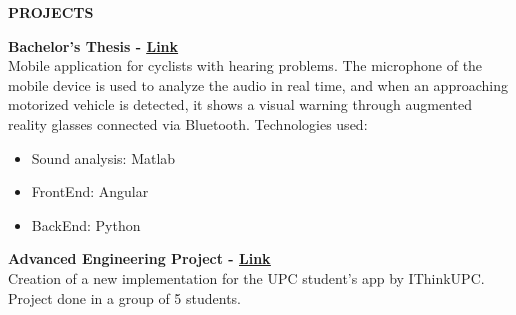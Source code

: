 \documentclass[../main.tex]{subfiles}
\begin{document}
    \textbf{\textcolor{myCV2}{PROJECTS\underline{\hspace{15.8cm}}}}
    \vspace*{0.3cm}
    
    \textbf{Bachelor's Thesis - 
        \hspace*{0.07cm}
        \textcolor{myCV2}{
        \vspace*{0.1cm}\underline{\href{https://www.youtube.com/watch?v=WKyUsdZbQ0Y}{Link}}}}\\
        Mobile application for cyclists with hearing problems. The microphone of the mobile device is used to analyze the audio in real time, and when an approaching motorized vehicle is detected, it shows a visual warning through augmented reality glasses connected via Bluetooth. Technologies used:

        \begin{itemize}
            \vspace*{-0.2cm}
            \item Sound analysis: Matlab
            \vspace*{-0.2cm}
            \item FrontEnd: Angular
            \vspace*{-0.2cm}
            \item BackEnd: Python
        \end {itemize}
        
        \textbf{Advanced Engineering Project - 
         \hspace*{0.07cm}
         \textcolor{myCV2}{
        \vspace*{0.1cm}\underline{\href{https://www.youtube.com/watch?v=RrfiOulhY-E&t=7s}{Link}}}}\\
        Creation of a new implementation for the UPC student's app by IThinkUPC. Project done in a group of 5 students.

        
\end{document}
